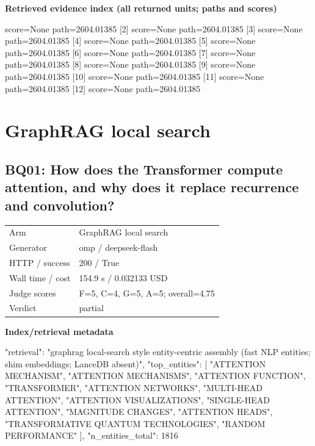 \documentclass[10pt]{article}
\begin{document}
\textbf{Retrieved evidence index (all returned units; paths and scores) }
\begin{EvidenceText}
[1] score=None path=2604.01385
[2] score=None path=2604.01385
[3] score=None path=2604.01385
[4] score=None path=2604.01385
[5] score=None path=2604.01385
[6] score=None path=2604.01385
[7] score=None path=2604.01385
[8] score=None path=2604.01385
[9] score=None path=2604.01385
[10] score=None path=2604.01385
[11] score=None path=2604.01385
[12] score=None path=2604.01385
\end{EvidenceText}
\section{GraphRAG local search}
\subsection{BQ01: How does the Transformer compute attention, and why does it replace recurrence and convolution?}
\begin{tabular}{@{}ll@{}}
Arm & GraphRAG local search\\
Generator & omp / deepseek-flash\\
HTTP / success & 200 / True\\
Wall time / cost & 154.9 s / 0.032133 USD\\
Judge scores & F=5, C=4, G=5, A=5; overall=4.75\\
Verdict & partial\\
\end{tabular}

\textbf{Index/retrieval metadata}
\begin{EvidenceText}
{
  "retrieval": "graphrag local-search style entity-centric assembly (fast NLP entities; shim embeddings; LanceDB absent)",
  "top_entities": [
    "ATTENTION MECHANISM",
    "ATTENTION MECHANISMS",
    "ATTENTION FUNCTION",
    "TRANSFORMER",
    "ATTENTION NETWORKS",
    "MULTI-HEAD ATTENTION",
    "ATTENTION VISUALIZATIONS",
    "SINGLE-HEAD ATTENTION",
    "MAGNITUDE CHANGES",
    "ATTENTION HEADS",
    "TRANSFORMATIVE QUANTUM TECHNOLOGIES",
    "RANDOM PERFORMANCE"
  ],
  "n_entities_total": 1816
}
\end{EvidenceText}
\end{document}
